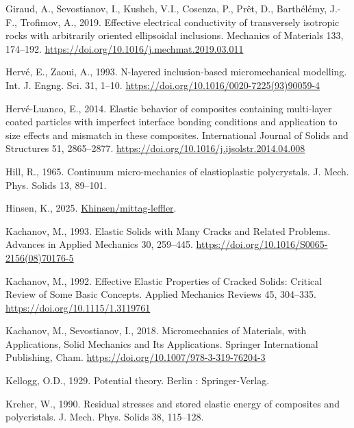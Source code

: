 \documentclass[
  a4paper,
  numbers=noendperiod,
  DIV=12]{scrreprt}
\newlength{\cslhangindent}
\newenvironment{CSLReferences}[2] %
 {\begin{list}{}{%
  \setlength{\itemindent}{0pt}
  \setlength{\leftmargin}{0pt}
  \setlength{\parsep}{0pt}
  \ifodd #1
   \setlength{\leftmargin}{\cslhangindent}
   \setlength{\itemindent}{-1\cslhangindent}
  \fi
  \setlength{\itemsep}{#2\baselineskip}}}
 {\end{list}}
\begin{document}
\begin{CSLReferences}{1}{0}
Giraud, A., Sevostianov, I., Kushch, V.I., Cosenza, P., Prêt, D.,
Barthélémy, J.-F., Trofimov, A., 2019. Effective electrical conductivity
of transversely isotropic rocks with arbitrarily oriented ellipsoidal
inclusions. Mechanics of Materials 133, 174--192.
\url{https://doi.org/10.1016/j.mechmat.2019.03.011}

Hervé, E., Zaoui, A., 1993. N-layered inclusion-based micromechanical
modelling. Int. J. Engng. Sci. 31, 1--10.
\url{https://doi.org/10.1016/0020-7225(93)90059-4}

Hervé-Luanco, E., 2014. Elastic behavior of composites containing
multi-layer coated particles with imperfect interface bonding conditions
and application to size effects and mismatch in these composites.
International Journal of Solids and Structures 51, 2865--2877.
\url{https://doi.org/10.1016/j.ijsolstr.2014.04.008}

Hill, R., 1965. Continuum micro-mechanics of elastioplastic
polycrystals. J. Mech. Phys. Solids 13, 89--101.

Hinsen, K., 2025.
\href{https://github.com/khinsen/mittag-leffler}{Khinsen/mittag-leffler}.

Kachanov, M., 1993. Elastic {Solids} with {Many Cracks} and {Related
Problems}. Advances in Applied Mechanics 30, 259--445.
\url{https://doi.org/10.1016/S0065-2156(08)70176-5}

Kachanov, M., 1992. Effective {Elastic Properties} of {Cracked Solids}:
{Critical Review} of {Some Basic Concepts}. Applied Mechanics Reviews
45, 304--335. \url{https://doi.org/10.1115/1.3119761}

Kachanov, M., Sevostianov, I., 2018. Micromechanics of {Materials}, with
{Applications}, Solid {Mechanics} and {Its Applications}. Springer
International Publishing, Cham.
\url{https://doi.org/10.1007/978-3-319-76204-3}

Kellogg, O.D., 1929. Potential theory. Berlin : Springer-Verlag.

Kreher, W., 1990. Residual stresses and stored elastic energy of
composites and polycristals. J. Mech. Phys. Solids 38, 115--128.


\end{CSLReferences}
\end{document}
